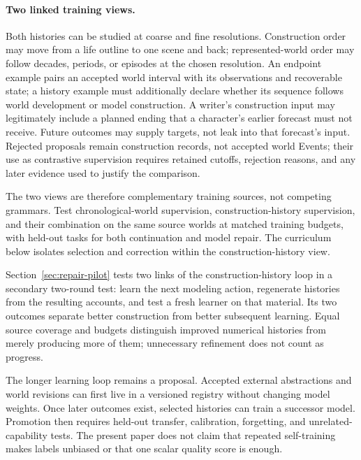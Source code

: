 \documentclass[10pt]{article}
\begin{document}
\paragraph{Two linked training views.}
Both histories can be studied at coarse and fine resolutions. Construction
order may move from a life outline to one scene and back; represented-world
order may follow decades, periods, or episodes at the chosen resolution.
An endpoint example pairs an accepted
world interval with its observations and recoverable state; a history example
must additionally declare whether its sequence follows world development or
model construction. A writer's construction input may legitimately include
a planned ending that a character's earlier forecast must not receive.
Future outcomes may supply targets, not leak into that forecast's input.
Rejected proposals remain construction records, not accepted world Events;
their use as contrastive supervision requires retained cutoffs, rejection
reasons, and any later evidence used to justify the comparison.

The two views are therefore complementary training sources, not competing
grammars. Test chronological-world supervision, construction-history
supervision, and their combination on the same source worlds at matched
training budgets, with held-out tasks for both continuation and model repair. The curriculum
below isolates selection and correction within the construction-history view.

Section~\ref{sec:repair-pilot} tests two links of the construction-history loop
in a secondary two-round test:
learn the next modeling action, regenerate histories from the resulting
accounts, and test a fresh learner on that material. Its two outcomes separate
better construction from better subsequent learning. Equal source coverage and
budgets distinguish improved numerical histories from merely producing more
of them; unnecessary refinement does not count as progress.

The longer learning loop remains a proposal. Accepted external abstractions and
world revisions can first live in a versioned registry without changing model
weights. Once later outcomes exist, selected histories can train a successor
model. Promotion then requires held-out transfer, calibration, forgetting, and
unrelated-capability tests. The present paper does not claim that repeated
self-training makes labels unbiased or that one scalar quality score is enough.
\end{document}
